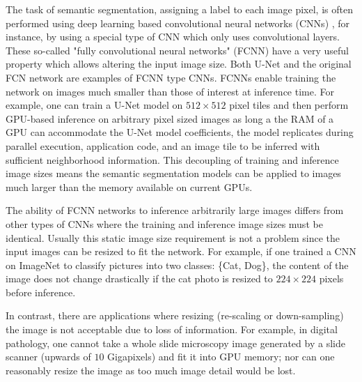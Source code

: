 \documentclass[runningheads]{llncs}
\begin{document}
The task of semantic segmentation, assigning a label to each image pixel, is often performed using deep learning based convolutional neural networks (CNNs) \cite{Badrinarayanan2015a,Ronneberger2015a}, for instance, by using a special type of CNN which only uses convolutional layers.
These so-called "fully convolutional neural networks" (FCNN) have a very useful property which allows altering the input image size. 
Both U-Net \cite{Ronneberger2015a} and the original FCN network \cite{Long2015} are examples of FCNN type CNNs. 
FCNNs enable training the network on images much smaller than those of interest at inference time. 
For example, one can train a U-Net model on $512 \times 512$ pixel tiles and then perform GPU-based inference on arbitrary pixel sized images as long a the RAM of a GPU can accommodate the U-Net model coefficients, the model replicates during parallel execution, application code, and an image tile to be inferred with sufficient neighborhood information. This decoupling of training and inference image sizes means the semantic segmentation models can be applied to images much larger than the memory available on current GPUs. 

The ability of FCNN networks to inference arbitrarily large images differs from other types of CNNs where the training and inference image sizes must be identical. Usually this static image size requirement is not a problem since the input images can be resized to fit the network. For example, if one trained a CNN on ImageNet \cite{Russakovsky2015} to classify pictures into two classes: \{Cat, Dog\}, the content of the image does not change drastically if the cat photo is resized to $224 \times 224$ pixels before inference.


In contrast, there are applications where resizing (re-scaling or down-sampling) the image is not acceptable due to loss of information. For example, in digital pathology, one cannot take a whole slide microscopy image generated by a slide scanner (upwards of $\num{10}$ Gigapixels) and fit it into GPU memory; nor can one reasonably resize the image as too much image detail would be lost. 
\end{document}
